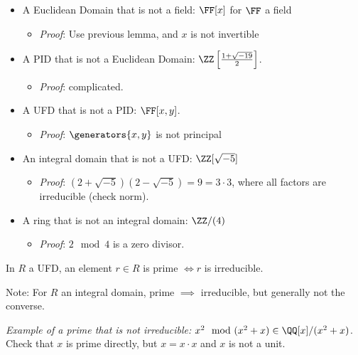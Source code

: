 \begin{itemize}
\tightlist
\item
  A Euclidean Domain that is not a field: \(\FF[x]\) for \(\FF\) a field

  \begin{itemize}
  \tightlist
  \item
    \emph{Proof}: Use previous lemma, and \(x\) is not invertible
  \end{itemize}
\item
  A PID that is not a Euclidean Domain:
  \(\ZZ\left[\frac{1 + \sqrt{-19}}{2}\right]\).

  \begin{itemize}
  \tightlist
  \item
    \emph{Proof}: complicated.
  \end{itemize}
\item
  A UFD that is not a PID: \(\FF[x, y]\).

  \begin{itemize}
  \tightlist
  \item
    \emph{Proof}: \(\generators{x, y}\) is not principal
  \end{itemize}
\item
  An integral domain that is not a UFD: \(\ZZ[\sqrt{-5}]\)

  \begin{itemize}
  \tightlist
  \item
    \emph{Proof}: \((2+\sqrt{-5})(2-\sqrt{-5})=9=3\cdot 3\), where all
    factors are irreducible (check norm).
  \end{itemize}
\item
  A ring that is not an integral domain: \(\ZZ/(4)\)

  \begin{itemize}
  \tightlist
  \item
    \emph{Proof}: \(2 \mod 4\) is a zero divisor.
  \end{itemize}
\end{itemize}

\begin{description}
\tightlist
\item[Lemma]
In \(R\) a UFD, an element \(r\in R\) is prime \(\iff r\) is
irreducible.
\end{description}

Note: For \(R\) an integral domain, prime \(\implies\) irreducible, but
generally not the converse.

\emph{Example of a prime that is not irreducible:}
\(x^2 \mod (x^2 + x) \in \QQ[x]/(x^2 + x)\). Check that \(x\) is prime
directly, but \(x=x\cdot x\) and \(x\) is not a unit.


